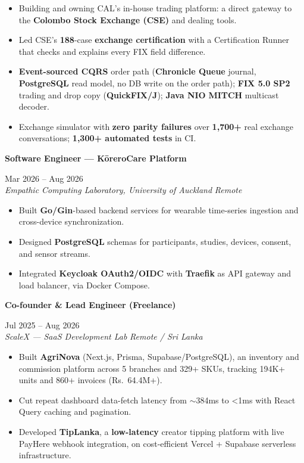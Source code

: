 \documentclass[a4paper,9pt]{extarticle}
\newcommand{\titleblock}[1]{%
  \begingroup
  \setlength{\fboxsep}{1pt}%
  \colorbox{BlockGray}{\strut\textbf{\textcolor{BlockText}{#1}}}%
  \endgroup
}
\newcommand{\kw}[1]{\textbf{#1}}
\newcommand{\skw}[1]{\textbf{#1}}
\newcommand{\CVExperienceEntry}[4]{
  \noindent \titleblock{#1} \hfill #2 \\
  \noindent \textit{#3} \hfill \textit{#4} \par\vspace{0.22em}
}
\begin{document}
\begin{itemize}[leftmargin=*, itemsep=0.2em, topsep=0.1em]
  \item Building and owning CAL's in-house trading platform: a direct gateway to the \skw{Colombo Stock Exchange (CSE)} and dealing tools.
  \item Led CSE's \skw{188}-case \skw{exchange certification} with a Certification Runner that checks and explains every FIX field difference.
  \item \kw{Event-sourced CQRS} order path (\kw{Chronicle Queue} journal, \kw{PostgreSQL} read model, no DB write on the order path); \kw{FIX 5.0 SP2} trading and drop copy (\kw{QuickFIX/J}); \kw{Java NIO} \kw{MITCH} multicast decoder.
  \item Exchange simulator with \skw{zero parity failures} over \skw{1,700+} real exchange conversations; \skw{1,300+ automated tests} in CI.
\end{itemize}
\vspace{0.12em}

\CVExperienceEntry
{Software Engineer --- KōreroCare Platform}
{Mar 2026 -- Aug 2026}
{Empathic Computing Laboratory, University of Auckland}
{Remote}

\begin{itemize}[leftmargin=*, itemsep=0.2em, topsep=0.1em]
  \item Built \skw{Go/Gin}-based backend services for wearable time-series ingestion and cross-device synchronization.
  \item Designed \kw{PostgreSQL} schemas for participants, studies, devices, consent, and sensor streams.
  \item Integrated \skw{Keycloak OAuth2/OIDC} with \kw{Traefik} as API gateway and load balancer, via Docker Compose.
\end{itemize}
\vspace{0.12em}

\CVExperienceEntry
{Co-founder \& Lead Engineer (Freelance)}
{Jul 2025 -- Aug 2026}
{ScaleX --- SaaS Development Lab}
{Remote / Sri Lanka}

\begin{itemize}[leftmargin=*, itemsep=0.2em, topsep=0.1em]
  \item Built \kw{AgriNova} (Next.js, Prisma, Supabase/PostgreSQL), an inventory and commission platform across 5 branches and 329+ SKUs, tracking 194K+ units and 860+ invoices (Rs.~64.4M+).
  \item Cut repeat dashboard data-fetch latency from $\sim$384ms to <1ms with React Query caching and pagination.
  \item Developed \kw{TipLanka}, a \kw{low-latency} creator tipping platform with live PayHere webhook integration, on cost-efficient Vercel + Supabase serverless infrastructure.
\end{itemize}
\vspace{0.12em}
\end{document}
